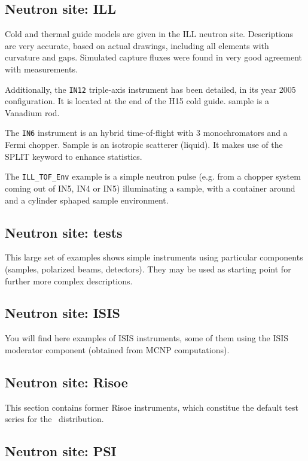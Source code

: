 \subsection{Neutron site: ILL}

Cold and thermal guide models are given in the ILL neutron site. Descriptions are very accurate, based on actual drawings, including all elements with curvature and gaps. Simulated capture fluxes were found in very good agreement with measurements.

Additionally, the \verb+IN12+ triple-axis instrument has been detailed, in its year 2005 configuration. It is located at the end of the H15 cold guide. sample is a Vanadium rod.

The \verb+IN6+ instrument is an hybrid time-of-flight with 3 monochromators and a Fermi chopper. Sample is an isotropic scatterer (liquid). It makes use of the SPLIT keyword to enhance statistics. 

The \verb+ILL_TOF_Env+ example is a simple neutron pulse (e.g. from a chopper system coming out of IN5, IN4 or IN5) illuminating a sample, with a container around and a cylinder sphaped sample environment.

\subsection{Neutron site: tests}

This large set of examples shows simple instruments using particular components (samples, polarized beams, detectors). They may be used as starting point for further more complex descriptions.

\subsection{Neutron site: ISIS}

You will find here examples of ISIS instruments, some of them using the ISIS moderator component (obtained from MCNP computations).

\subsection{Neutron site: Risoe}

This section contains former Risoe instruments, which constitue the default test series for the \MCS\ distribution.

\subsection{Neutron site: PSI}

